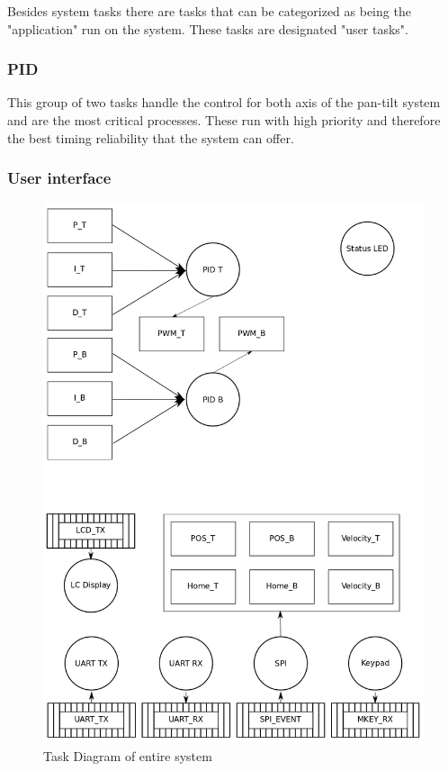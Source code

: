 \documentclass[../../../main]{subfiles}
\begin{document}
Besides system tasks there are tasks that can be categorized as being the "application" run on the system. These tasks are designated "user tasks".

\subsubsection{PID}

This group of two tasks handle the control for both axis of the pan-tilt system and are the most critical processes. These run with high priority and therefore the best timing reliability that the system can offer.

\subsubsection{User interface}


\begin{figure}[H]
\includegraphics[width=\columnwidth]{taskdiagram_full.png}
\caption{Task Diagram of entire system}
\label{fig:entire_task_diagram}
\end{figure}
\end{document}
